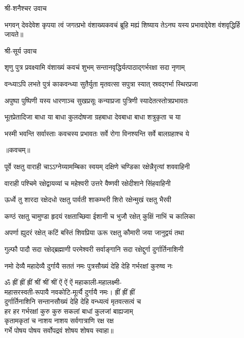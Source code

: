 
\centerline{श्री-शनैश्चर उवाच}

\twolineshloka
{भगवन् देवदेवेश कृपया त्वं जगत्प्रभो}
{वंशाख्यकवचं ब्रूहि मह्यं शिष्याय तेऽनघ}%
{यस्य प्रभावाद्देवेश वंशवृद्धिर्हि जायते॥}

\centerline{श्री-सूर्य उवाच}

\twolineshloka
{शृणु पुत्र प्रवक्ष्यामि वंशाख्यं कवचं शुभम्}
{सन्तानवृद्धिर्यत्पाठाद्गर्भरक्षा सदा नृणाम्}%

\twolineshloka
{वन्ध्याऽपि लभते पुत्रं काकवन्ध्या सुतैर्युता}
{मृतवत्सा सपुत्रा स्यात् स्रवद्गर्भा स्थिरप्रजा}%

\twolineshloka
{अपुष्पा पुष्पिणी यस्य धारणाञ्च सुखप्रसूः}
{कन्याप्रजा पुत्रिणी स्यादेतत्स्तोत्रप्रभावतः}%


\twolineshloka
{भूतप्रेतादिजा बाधा या बाधा कुलदोषजा}
{ग्रहबाधा देवबाधा बाधा शत्रुकृता च या}%

\twolineshloka
{भस्मी भवन्ति सर्वास्ताः कवचस्य प्रभावतः}
{सर्वे रोगा विनश्यन्ति सर्वे बालग्रहाश्च ये}%

\centerline{॥कवचम्॥}

\twolineshloka
{पूर्वे रक्षतु वाराही चाऽऽग्नेय्यामम्बिका स्वयम्}
{दक्षिणे चण्डिका रक्षेन्नैरृत्यां शववाहिनी}%

\twolineshloka
{वाराही पश्चिमे रक्षेद्वायव्यां च महेश्वरी}
{उत्तरे वैष्णवी रक्षेदीशाने सिंहवाहिनी}%

\twolineshloka
{ऊर्ध्वे तु शारदा रक्षेदधो रक्षतु पार्वती}
{शाकम्भरी शिरो रक्षेन्मुखं रक्षतु भैरवी}%

\twolineshloka
{कण्ठं रक्षतु चामुण्डा हृदयं रक्षताच्छिवा}
{ईशानी च भुजौ रक्षेत् कुक्षिं नाभिं च कालिका}%

\twolineshloka
{अपर्णा ह्युदरं रक्षेत् कटिं बस्तिं शिवप्रिया}
{ऊरू रक्षतु कौमारी जया जानुद्वयं तथा}%

\twolineshloka
{गुल्फौ पादौ सदा रक्षेद्ब्रह्माणी परमेश्वरी}
{सर्वाङ्गानि सदा रक्षेद्दुर्गा दुर्गार्तिनाशिनी}%

\twolineshloka
{नमो देव्यै महादेव्यै दुर्गायै सततं नमः}
{पुत्रसौख्यं देहि देहि गर्भरक्षां कुरुष्व नः}%

ॐ ह्रीं ह्रीं ह्रीं श्रीं श्रीं श्रीं ऐं ऐं ऐं महाकाली-महालक्ष्मी-\\
महासरस्वती-रूपायै नवकोटि-मूर्त्यै दुर्गायै नमः। ह्रीं ह्रीं ह्रीं\\
दुर्गार्तिनाशिनि सन्तानसौख्यं देहि देहि वन्ध्यत्वं मृतवत्सत्वं च\\
हर हर गर्भरक्षां कुरु कुरु सकलां बाधां कुलजां बाह्यजाम्\\
कृतामकृतां च नाशय नाशय सर्वगात्राणि रक्ष रक्ष \\
गर्भे पोषय पोषय सर्वोपद्रवं शोषय शोषय स्वाहा॥

